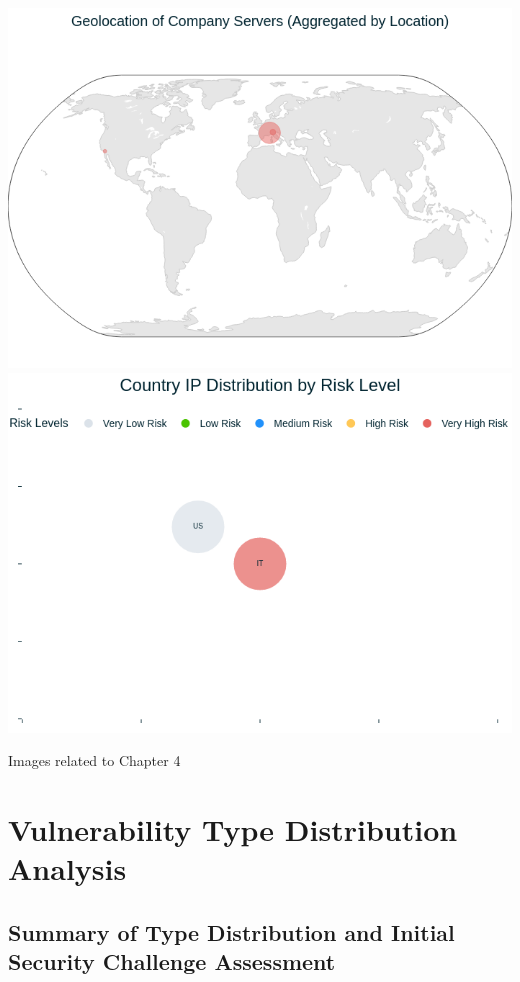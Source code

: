\begin{center}
\includegraphics[width=\linewidth]{pngs/3_1.png}
\vspace{1cm}\includegraphics[width=\linewidth]{pngs/3_2.png}
\vspace{1cm}\caption{Images related to Chapter 4}
\end{center}
\chapter{Vulnerability Type Distribution Analysis}
\section{Summary of Type Distribution and Initial Security Challenge Assessment}

